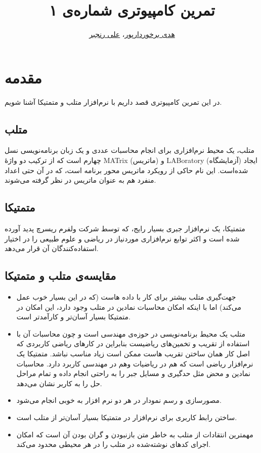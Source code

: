 \documentclass{utsignal}
\title{تمرین کامپیوتری شماره‌ی ۱}
\author{\href{mailto:hodabpour@gmail.com?subject=[SS\%20S98 A1]}{هدی برخوردارپور}، 
\href{mailto:ranjbar.ali@ut.ac.ir?subject=[SS\%20S98 A1]\%20}{علی رنجبر}}
\begin{document}
    \maketitle
    \section{مقدمه}
        در این تمرین کامپیوتری قصد داریم با نرم‌افزار ‌‌متلب  و متمتیکا آشنا شویم.
    \subsection{متلب}
 متلب، یک محیط نرم‌افزاری برای انجام محاسبات عددی و یک زبان برنامه‌نویسی نسل چهارم است که از ترکیب دو واژهٔ MATrix (ماتریس) و LABoratory (آزمایشگاه) ایجاد شده‌است.  این نام حاکی از رویکرد ماتریس محور برنامه است، که در آن حتی اعداد منفرد هم به عنوان ماتریس در نظر گرفته می‌شوند.
    \subsection{متمتیکا}
    متمتیکا، یک نرم‌افزار جبری بسیار رایج، که توسط شرکت ولفرم ریسرچ پدید آورده شده است و اکثر توابع نرم‌افزاری موردنیاز در ریاضی و علوم طبیعی را در اختیار استفاده‌کنندگان آن قرار می‌دهد.
    \subsection{مقایسه‌ی متلب و متمتیکا}
    \begin{itemize}
        \item جهت‌گیری متلب بیشتر برای کار با داده هاست (که در این بسیار خوب عمل می‌کند) اما با اینکه امکان محاسبات نمادین در‌ متلب وجود دارد، این امکان در متمتیکا بسیار آسان‌تر و کارآمدتر است. 
        \item متلب یک محیط برنامه‌نویسی در حوزه‌ی مهندسی است و چون محاسبات آن با استفاده از تقریب و تخمین‌های ریاضیست بنابراین در کارهای ریاضی کاربردی که اصل کار همان ساختن تقریب هاست ممکن است زیاد مناسب نباشد. 
    متمتیکا یک نرم‌افزار ریاضی است که هم در ریاضیات وهم در مهندسی کاربرد دارد. محاسبات نمادین و محض مثل حدگیری و مسایل جبر را به راحتی انجام داده و تمام مراحل حل را به کاربر نشان می‌دهد.
    
    \item مصورسازی و رسم نمودار در هر دو نرم افزار به خوبی انجام می‌شود.
    
    \item ساختن رابط کاربری برای نرم‌افزار در متمتیکا بسیار آسان‌تر از متلب است.
    \item مهمترین انتقادات از متلب به خاطر متن بازنبودن و گران بودن آن است که امکان اجرای کدهای نوشته‌شده در متلب را در هر محیطی محدود می‌کند.
    
	\end{itemize}
\end{document}
